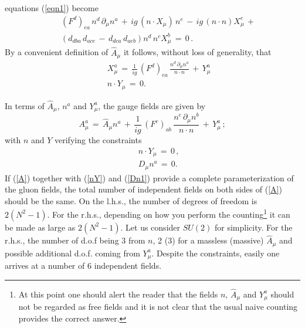 \documentclass[a4paper,a4paper]{article}
\begin{document}
equations (\ref{eqn1}) become
\begin{eqnarray}
 &  &  \left( F^d \right)_{ea} \, n^d \, \partial_\mu n^a \, + \, 
 i g \, ( n \cdot X_\mu ) \, n^e \, - \,
  i g \, ( n \cdot n ) X^e_\mu \, + \, 
\nonumber \\
 & &
 \left(  d_{dba} \, d_{ace} \, - \,
         d_{dca} \, d_{aeb} \right) n^d \, n^c X^b_\mu
 \, = \, 0 \, . \label{eqn2}
\end{eqnarray}
By a convenient definition of $\hat{A}_\mu$ it follows, without loss
of generality, that
\begin{eqnarray}
  &  &  X^a_\mu \, = \, \frac{1}{ig} \, \left( F^d \right)_{ea} \,
                   \frac{ n^d \, \partial_\mu n^a }{ n \cdot n } \, + \,
                 Y^a_\mu  \\
  &  &  n \cdot Y_\mu \, = \, 0. 
\end{eqnarray}


In terms of $\hat{A}_\mu$, $n^a$ and $Y^a_\mu$, the gauge fields are given by
\begin{equation}
 A^a_\mu \, = \, \hat{A}_\mu n^a \, + \,
                 \frac{1}{ig} \, \left( F^c \right)_{ab} \,
                              \frac{n^c \, \partial_\mu n^b}{n \cdot n} \, + \,
                 Y^a_\mu
 \, ; \label{A}
\end{equation}
with $n$ and $Y$ verifying the constraints
\begin{eqnarray}
 & & n \cdot Y_\mu \, = \, 0 \, ,  \label{nY} \\
 & & D_\mu n^a \, = \, 0  . \label{Dn1}
\end{eqnarray}
If (\ref{A}) together with (\ref{nY}) and (\ref{Dn1}) provide a complete
parameterization of the gluon fields, the total number of independent fields
on both sides of (\ref{A}) should be the same.
On the l.h.s., the number of degrees of freedom is $2 (N^2 - 1)$.
For the r.h.s., depending on how you perform the 
counting\footnote{At this point one should alert the reader that the fields 
$n$, $\hat{A}_\mu$ and $Y^a_\mu$ should not be regarded as free fields and 
it is not clear that the usual naive counting provides the correct answer.} 
it can be made as large as $2 (N^2 - 1)$. 
Let us consider $SU(2)$ for simplicity. 
For the r.h.s., the number of d.o.f being 3 
from $n$, 2 (3) for a massless (massive) $\hat{A}_\mu$ and possible additional
d.o.f. coming from $Y^a_\mu$. Despite the constraints, easily one arrives
at a number of 6 independent fields. 
\end{document}
